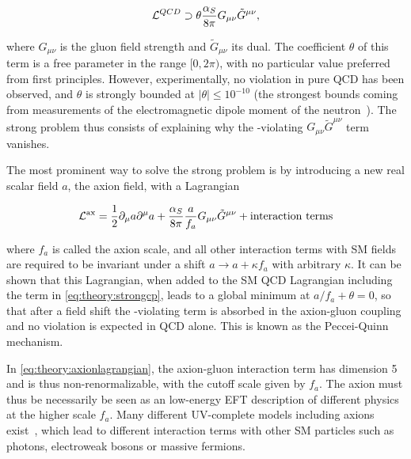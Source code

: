 \begin{equation}
\label{eq:theory:strongcp}
    \mathcal{L}^{QCD} \supset \theta \frac{\alpha_S}{8 \pi} G_{\mu \nu} \tilde{G}^{\mu \nu},
\end{equation}

\noindent where $G_{\mu \nu}$ is the gluon field strength and $\tilde{G}_{\mu \nu}$ its dual. The coefficient $\theta$ of this term is a free parameter in the range $[0,2\pi)$, with no particular value preferred from first principles. However, experimentally, no \CP violation in pure QCD has been observed, and $\theta$ is strongly bounded at $|\theta| \leq 10^{-10}$ (the strongest bounds coming from measurements of the electromagnetic dipole moment of the neutron~\cite{DiLuzio:2020wdo,Pendlebury:2015lrz,Abel:2020pzs}). The strong \CP problem thus consists of explaining why the \CP-violating $G_{\mu \nu} \tilde{G}^{\mu \nu}$ term vanishes.

The most prominent way to solve the strong \CP problem is by introducing a new real scalar field $a$, the axion field, with a Lagrangian~\cite{DiLuzio:2020wdo}

\begin{equation}
\label{eq:theory:axionlagrangian}
    \mathcal{L}^{\mathrm{ax}} = \frac{1}{2} \partial_\mu a \partial^\mu a + \frac{\alpha_S}{8 \pi} \frac{a}{f_a} G_{\mu \nu} \tilde{G}^{\mu \nu} + \text{interaction terms}
\end{equation}

\noindent where $f_a$ is called the axion scale, and all other interaction terms with SM fields are required to be invariant under a shift $a \rightarrow a + \kappa f_a$ with arbitrary $\kappa$. It can be shown that this Lagrangian, when added to the SM QCD Lagrangian including the term in \cref{eq:theory:strongcp}, leads to a global minimum at $a/f_a + \theta = 0$, so that after a field shift the \CP-violating term is absorbed in the axion-gluon coupling and no \CP violation is expected in QCD alone. This is known as the Peccei-Quinn mechanism.

In \cref{eq:theory:axionlagrangian}, the axion-gluon interaction term has dimension 5 and is thus non-renormalizable, with the cutoff scale given by $f_a$. The axion must thus be necessarily be seen as an low-energy EFT description of different physics at the higher scale $f_a$. Many different UV-complete models including axions exist~\cite{DiLuzio:2020wdo,Kim:1979if,Shifman:1979if,Dine:1981rt,Zhitnitsky:1980tq}, which lead to different interaction terms with other SM particles such as photons, electroweak bosons or massive fermions.

